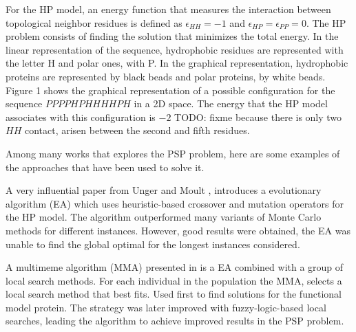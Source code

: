 \documentclass[conference]{IEEEtran}
\begin{document}


For the HP model, an energy function that  measures the interaction between topological  neighbor residues is defined  as  $\epsilon_{HH}=-1$ and $\epsilon_{HP}=\epsilon_{PP}=0$. The HP problem consists of finding the solution that minimizes the total energy. In the linear representation of the sequence, hydrophobic residues are represented with the letter H and polar ones, with P. In the graphical representation, hydrophobic proteins are represented  by black beads and polar proteins, by white beads.  Figure 1 shows the graphical representation of a possible configuration for  the sequence  $PPPPHPHHHHPH$ in a 2D space. The energy that the HP model associates with this configuration is $-2$ TODO: fixme because there is only two $HH$ contact, arisen between the second and fifth residues.


Among many works that explores the PSP problem, here are some examples of the approaches that have been used to solve it.

A very influential paper from Unger and Moult  \cite{unger1993genetic}, introduces a evolutionary algorithm (EA) which uses heuristic-based crossover and mutation operators for the HP model. The algorithm outperformed many variants of Monte Carlo methods for different instances. However,
good results were obtained, the EA was unable to find the global optimal for the longest instances considered.

%



A multimeme algorithm (MMA) presented in \cite{krasnogor2002multimeme} is a EA combined with a
group of local search methods. For each individual in the population the MMA, selects a local search method that best fits. Used first to find solutions for the functional model protein. The strategy was later improved with fuzzy-logic-based local searches, leading the algorithm to achieve improved results in the PSP problem.

\end{document}

